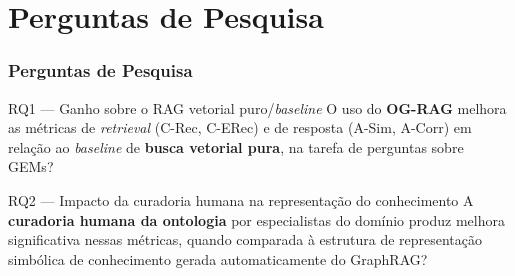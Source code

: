 \section{Perguntas de Pesquisa} %

\begin{frame}
	\frametitle{Perguntas de Pesquisa}
	\begin{block}{RQ1 --- Ganho sobre o  RAG vetorial puro/\textit{baseline}}
		O uso do \textbf{OG-RAG} melhora as métricas de \textit{retrieval} (C-Rec, C-ERec) e de resposta (A-Sim, A-Corr) em relação ao \textit{baseline} de \textbf{busca vetorial pura}, na tarefa de perguntas sobre GEMs?
	\end{block}
	\begin{block}{RQ2 --- Impacto da curadoria humana na representação do conhecimento}
		A \textbf{curadoria humana da ontologia} por especialistas do domínio produz melhora significativa nessas métricas, quando comparada à  estrutura de representação simbólica de conhecimento gerada automaticamente do GraphRAG?
	\end{block}
\end{frame}